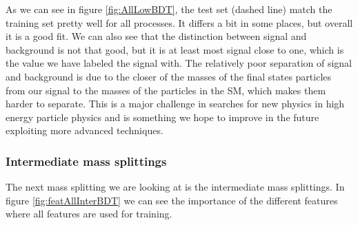 As we can see in figure \ref{fig:AllLowBDT}, the test set (dashed line) match the training set pretty well for all processes. It differs a bit in some places, but overall it is a good fit. We can also see that the distinction between signal and background is not that good, but it is at least most signal close to one, which is the value we have labeled the signal with. The relatively poor separation of signal and background is due to the closer of the masses of the final states particles from our signal to the masses of the particles in the SM, which makes them harder to separate. This is a major challenge in searches for new physics in high energy particle physics and is something we hope to improve in the future exploiting more advanced techniques.



























\subsubsection{Intermediate mass splittings}

The next mass splitting we are looking at is the intermediate mass splittings. In figure \ref{fig:featAllInterBDT} we can see the importance of the different features where all features are used for training. 

